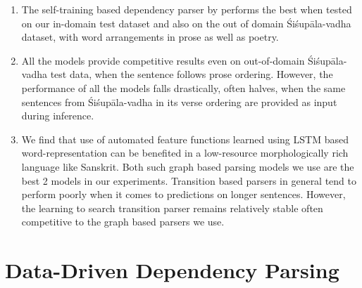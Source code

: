 \documentclass[11pt]{article}
\begin{document}
 \begin{enumerate}
     \item The self-training based dependency parser by  performs the best when tested on our in-domain test dataset \cite{kulkarni-2013-deterministic} and also on the out of domain Śiśupāla-vadha dataset, with word arrangements in prose as well as poetry.
     
     \item All the models provide competitive results even on out-of-domain Śiśupāla-vadha test data, when the sentence follows prose ordering. However, the performance of all the models falls drastically, often halves, when the same sentences from Śiśupāla-vadha in its verse ordering are provided as input during inference. 
     
     \item We find that use of automated feature functions learned using LSTM based word-representation can be benefited in a low-resource morphologically rich language like Sanskrit. Both such graph based parsing models we use \cite{DBLP:conf/iclr/DozatM17,rotman2019deep}  are the best 2 models in our experiments. Transition based parsers in general tend to perform poorly when it comes to predictions on longer sentences. However, the learning to search transition parser remains relatively stable often competitive to the graph based parsers we use.
 \end{enumerate}
 

%
% 


\section{Data-Driven Dependency Parsing}
\end{document}
